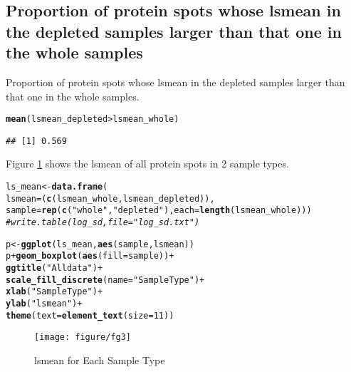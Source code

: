 \documentclass{article}\usepackage[]{graphicx}\usepackage[]{color}
\makeatletter
\def\maxwidth{ %
  \ifdim\Gin@nat@width>\linewidth
    \linewidth
  \else
    \Gin@nat@width
  \fi
}
\newcommand{\hlnum}[1]{\textcolor[rgb]{0.686,0.059,0.569}{#1}}%
\newcommand{\hlstr}[1]{\textcolor[rgb]{0.192,0.494,0.8}{#1}}%
\newcommand{\hlcom}[1]{\textcolor[rgb]{0.678,0.584,0.686}{\textit{#1}}}%
\newcommand{\hlopt}[1]{\textcolor[rgb]{0,0,0}{#1}}%
\newcommand{\hlstd}[1]{\textcolor[rgb]{0.345,0.345,0.345}{#1}}%
\newcommand{\hlkwb}[1]{\textcolor[rgb]{0.69,0.353,0.396}{#1}}%
\newcommand{\hlkwc}[1]{\textcolor[rgb]{0.333,0.667,0.333}{#1}}%
\newcommand{\hlkwd}[1]{\textcolor[rgb]{0.737,0.353,0.396}{\textbf{#1}}}%
\newenvironment{kframe}{%
 \def\at@end@of@kframe{}%
 \ifinner\ifhmode%
  \def\at@end@of@kframe{\end{minipage}}%
  \begin{minipage}{\columnwidth}%
 \fi\fi%
 \def\FrameCommand##1{\hskip\@totalleftmargin \hskip-\fboxsep
 \colorbox{shadecolor}{##1}\hskip-\fboxsep
     \hskip-\linewidth \hskip-\@totalleftmargin \hskip\columnwidth}%
 \MakeFramed {\advance\hsize-\width
   \@totalleftmargin\z@ \linewidth\hsize
   \@setminipage}}%
 {\par\unskip\endMakeFramed%
 \at@end@of@kframe}
\newenvironment{knitrout}{}{} %
\makeatother
\begin{document}
\subsection{Proportion of protein spots whose lsmean in the depleted samples larger than that one  in the whole samples}
Proportion of protein spots whose lsmean in the depleted samples larger than that one  in the whole samples.
\begin{knitrout}
\color{fgcolor}\begin{kframe}
\begin{alltt}
\hlkwd{mean}\hlstd{(lsmean_depleted} \hlopt{>} \hlstd{lsmean_whole)}
\end{alltt}
\begin{verbatim}
## [1] 0.569
\end{verbatim}
\end{kframe}
\end{knitrout}



Figure \ref{fig:fg3} shows the  lsmean of all protein spots in 2 sample types.  

\begin{knitrout}
\color{fgcolor}\begin{kframe}
\begin{alltt}
\hlstd{ls_mean} \hlkwb{<-} \hlkwd{data.frame}\hlstd{(}
  \hlkwc{lsmean} \hlstd{= (}\hlkwd{c}\hlstd{(lsmean_whole, lsmean_depleted)),}
  \hlkwc{sample} \hlstd{=} \hlkwd{rep}\hlstd{(}\hlkwd{c}\hlstd{(}\hlstr{"whole"}\hlstd{,} \hlstr{"depleted"}\hlstd{),} \hlkwc{each} \hlstd{=} \hlkwd{length}\hlstd{(lsmean_whole)))}
\hlcom{# write.table(log_sd, file = "log_sd.txt")}

\hlstd{p} \hlkwb{<-} \hlkwd{ggplot}\hlstd{(ls_mean,} \hlkwd{aes}\hlstd{(sample, lsmean))}
\hlstd{p} \hlopt{+} \hlkwd{geom_boxplot}\hlstd{(}\hlkwd{aes}\hlstd{(}\hlkwc{fill} \hlstd{= sample))} \hlopt{+}
  \hlkwd{ggtitle}\hlstd{(}\hlstr{"All data"}\hlstd{)} \hlopt{+}
  \hlkwd{scale_fill_discrete}\hlstd{(}\hlkwc{name}\hlstd{=} \hlstr{"Sample Type"}\hlstd{)} \hlopt{+}
  \hlkwd{xlab}\hlstd{(}\hlstr{"Sample Type"}\hlstd{)} \hlopt{+}
  \hlkwd{ylab}\hlstd{(}\hlstr{"lsmean"}\hlstd{)} \hlopt{+}
  \hlkwd{theme}\hlstd{(}\hlkwc{text} \hlstd{=} \hlkwd{element_text}\hlstd{(}\hlkwc{size}\hlstd{=}\hlnum{11}\hlstd{))}
\end{alltt}
\end{kframe}\begin{figure}[H]

\texttt{[image: figure/fg3]} \caption[lsmean for Each Sample Type]{lsmean for Each Sample Type\label{fig:fg3}}
\end{figure}


\end{knitrout}
\end{document}
